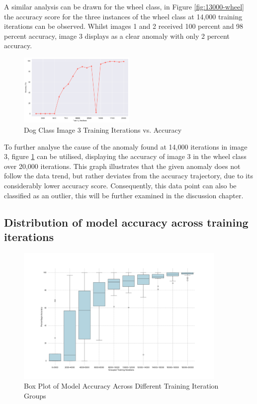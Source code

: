 A similar analysis can be drawn for the wheel class, in Figure \ref{fig:13000-wheel} the accuracy score for the three instances of the wheel class at 14,000 training iterations can be observed. Whilst images 1 and 2 received 100 percent and 98 percent accuracy, image 3 displays as a clear anomaly with only 2 percent accuracy. 


\begin{figure}[h]
   \centering
   \includegraphics[width=0.5\textwidth]{../Data/wheel_image1_accuracy_vs_iteration.png}
   \caption{Dog Class Image 3 Training Iterations vs. Accuracy }
   \label{fig:image-3-accuracy}
\end{figure}

To further analyse the cause of the anomaly found at 14,000 iterations in image 3, figure \ref{fig:image-3-accuracy} can be utilised, displaying the accuracy of image 3 in the wheel class over 20,000 iterations. This graph illustrates that the given anomaly does not follow the data trend, but rather deviates from the accuracy trajectory, due to its considerably lower accuracy score. Consequently, this data point can also be classified as an outlier, this will be further examined in the discussion chapter. \\
\newpage


\subsection{Distribution of model accuracy across training iterations}

\begin{figure}[h]
   \centering
   \includegraphics[width=0.9\textwidth]{../Data/box_plot_iteration_vs_accuracy.png}
   \caption{Box Plot of Model Accuracy Across Different Training Iteration Groups}
   \label{fig:Box-plot}
\end{figure}


